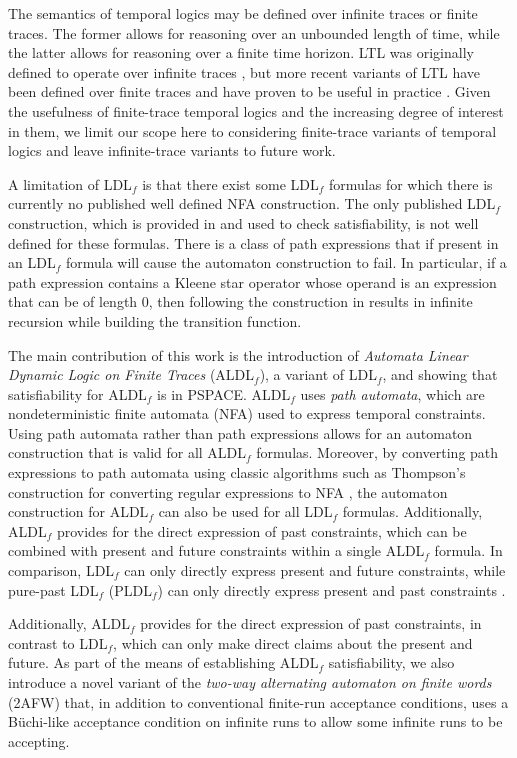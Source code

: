 \documentclass[10pt,a4paper]{amsart}
\theoremstyle{plain}
\theoremstyle{definition}
\theoremstyle{definition}
\DeclareMathOperator{\?}{?}
\begin{document}
The semantics of temporal logics may be defined over infinite traces or finite traces. The former allows for reasoning over an unbounded length of time, while the latter allows for reasoning over a finite time horizon. LTL was originally defined to operate over infinite traces \cite{pnueli77}, but more recent variants of LTL have been defined over finite traces and have proven to be useful in practice \cite{aalst,pevsic,ldlf}. Given the usefulness of finite-trace temporal logics and the increasing degree of interest in them, we limit our scope here to considering finite-trace variants of temporal logics and leave infinite-trace variants to future work.

A limitation of LDL$_f$ is that there exist some LDL$_f$ formulas for which there is currently no published well defined NFA construction. The only published LDL$_f$ construction, which is provided in \cite{ldlf} and used to check satisfiability, is not well defined for these formulas. There is a class of path expressions that if present in an LDL$_f$ formula will cause the automaton construction to fail. In particular, if a path expression contains a Kleene star operator whose operand is an expression that can be of length 0, then following the construction in \cite{ldlf} results in infinite recursion while building the transition function.

The main contribution of this work is the introduction of \textit{Automata Linear Dynamic Logic on Finite Traces} (ALDL$_f$), a variant of LDL$_f$, and showing that satisfiability for ALDL$_f$ is in PSPACE. ALDL$_f$ uses \textit{path automata}, which are nondeterministic finite automata (NFA) used to express temporal constraints. Using path automata rather than path expressions allows for an automaton construction that is valid for all ALDL$_f$ formulas. Moreover, by converting path expressions to path automata using classic algorithms such as Thompson's construction for converting regular expressions to NFA \cite{thompson}, the automaton construction for ALDL$_f$ can also be used for all LDL$_f$ formulas. Additionally, ALDL$_f$ provides for the direct expression of past constraints, which can be combined with present and future constraints within a single ALDL$_f$ formula. In comparison, LDL$_f$ can only directly express present and future constraints, while pure-past LDL$_f$ (PLDL$_f$) can only directly express present and past constraints \cite{pldlf}.

Additionally, ALDL$_f$ provides for the direct expression of past constraints, in contrast to LDL$_f$, which can only make direct claims about the present and future. As part of the means of establishing ALDL$_f$ satisfiability, we also introduce a novel variant of the \textit{two-way alternating automaton on finite words} (2AFW) that, in addition to conventional finite-run acceptance conditions, uses a B\"uchi-like acceptance condition on infinite runs to allow some infinite runs to be accepting.
\end{document}
